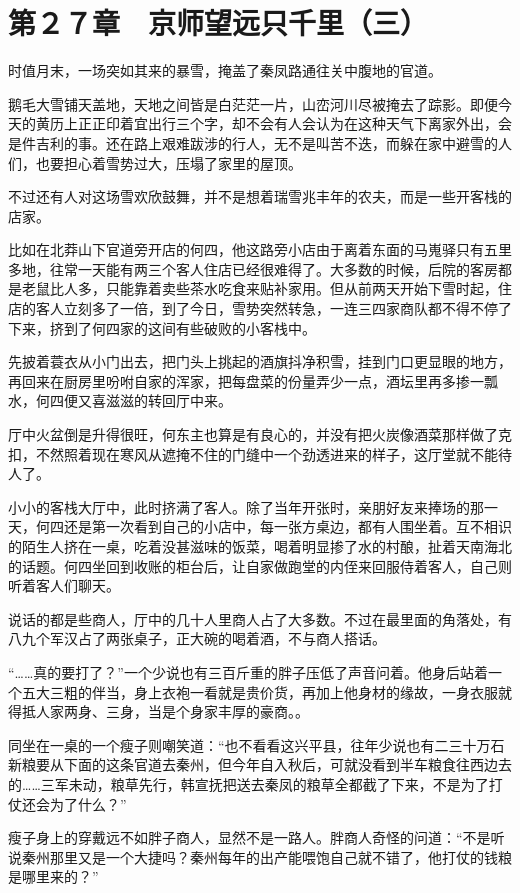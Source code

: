 \section{第２７章　京师望远只千里（三）}

时值月末，一场突如其来的暴雪，掩盖了秦凤路通往关中腹地的官道。

鹅毛大雪铺天盖地，天地之间皆是白茫茫一片，山峦河川尽被掩去了踪影。即便今天的黄历上正正印着宜出行三个字，却不会有人会认为在这种天气下离家外出，会是件吉利的事。还在路上艰难跋涉的行人，无不是叫苦不迭，而躲在家中避雪的人们，也要担心着雪势过大，压塌了家里的屋顶。

不过还有人对这场雪欢欣鼓舞，并不是想着瑞雪兆丰年的农夫，而是一些开客栈的店家。

比如在北莽山下官道旁开店的何四，他这路旁小店由于离着东面的马嵬驿只有五里多地，往常一天能有两三个客人住店已经很难得了。大多数的时候，后院的客房都是老鼠比人多，只能靠着卖些茶水吃食来贴补家用。但从前两天开始下雪时起，住店的客人立刻多了一倍，到了今日，雪势突然转急，一连三四家商队都不得不停了下来，挤到了何四家的这间有些破败的小客栈中。

先披着蓑衣从小门出去，把门头上挑起的酒旗抖净积雪，挂到门口更显眼的地方，再回来在厨房里吩咐自家的浑家，把每盘菜的份量弄少一点，酒坛里再多掺一瓢水，何四便又喜滋滋的转回厅中来。

厅中火盆倒是升得很旺，何东主也算是有良心的，并没有把火炭像酒菜那样做了克扣，不然照着现在寒风从遮掩不住的门缝中一个劲透进来的样子，这厅堂就不能待人了。

小小的客栈大厅中，此时挤满了客人。除了当年开张时，亲朋好友来捧场的那一天，何四还是第一次看到自己的小店中，每一张方桌边，都有人围坐着。互不相识的陌生人挤在一桌，吃着没甚滋味的饭菜，喝着明显掺了水的村酿，扯着天南海北的话题。何四坐回到收账的柜台后，让自家做跑堂的内侄来回服侍着客人，自己则听着客人们聊天。

说话的都是些商人，厅中的几十人里商人占了大多数。不过在最里面的角落处，有八九个军汉占了两张桌子，正大碗的喝着酒，不与商人搭话。

“……真的要打了？”一个少说也有三百斤重的胖子压低了声音问着。他身后站着一个五大三粗的伴当，身上衣袍一看就是贵价货，再加上他身材的缘故，一身衣服就得抵人家两身、三身，当是个身家丰厚的豪商。。

同坐在一桌的一个瘦子则嘲笑道：“也不看看这兴平县，往年少说也有二三十万石新粮要从下面的这条官道去秦州，但今年自入秋后，可就没看到半车粮食往西边去的……三军未动，粮草先行，韩宣抚把送去秦凤的粮草全都截了下来，不是为了打仗还会为了什么？”

瘦子身上的穿戴远不如胖子商人，显然不是一路人。胖商人奇怪的问道：“不是听说秦州那里又是一个大捷吗？秦州每年的出产能喂饱自己就不错了，他打仗的钱粮是哪里来的？”

